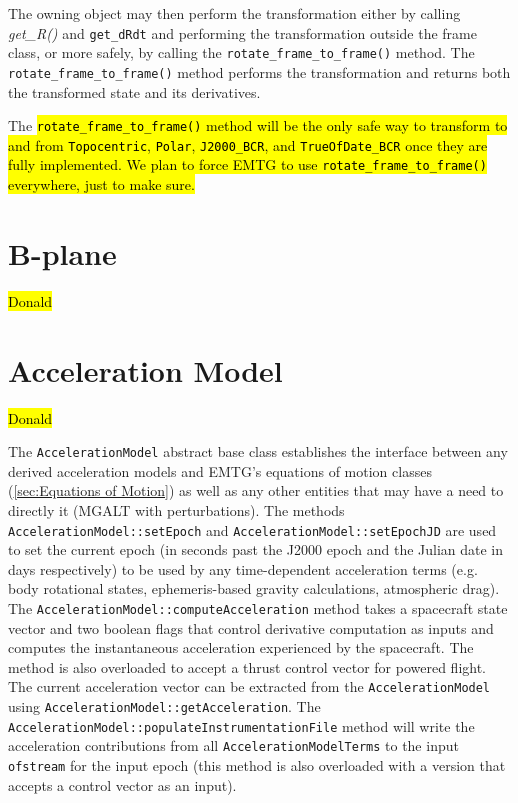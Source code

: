 The owning object may then perform the transformation either by calling \textit{get\_R()} and \texttt{get\_dRdt} and performing the transformation outside the frame class, or more safely, by calling the \texttt{rotate\_frame\_to\_frame()} method. The \texttt{rotate\_frame\_to\_frame()} method performs the transformation and returns both the transformed state and its derivatives.

The \hl{\texttt{rotate\_frame\_to\_frame()} method will be the only safe way to transform to and from \texttt{Topocentric}, \texttt{Polar}, \texttt{J2000\_BCR}, and \texttt{TrueOfDate\_BCR} once they are fully implemented. We plan to force EMTG to use \texttt{rotate\_frame\_to\_frame()} everywhere, just to make sure.}

\section{B-plane}
\label{sec:bplane}

\hl{Donald}

\section{Acceleration Model}
\label{sec:acceleration_model}

\hl{Donald}

The \texttt{AccelerationModel} abstract base class establishes the interface between any derived acceleration models and EMTG's equations of motion classes (\ref{sec:Equations of Motion}) as well as any other entities that may have a need to directly it (MGALT with perturbations). The methods \texttt{AccelerationModel::setEpoch} and \texttt{AccelerationModel::setEpochJD} are used to set the current epoch (in seconds past the J2000 epoch and the Julian date in days respectively) to be used by any time-dependent acceleration terms (e.g. body rotational states, ephemeris-based gravity calculations, atmospheric drag). The \texttt{AccelerationModel::computeAcceleration} method takes a spacecraft state vector and two boolean flags that control derivative computation as inputs and computes the instantaneous acceleration experienced by the spacecraft. The method is also overloaded to accept a thrust control vector for powered flight. The current acceleration vector can be extracted from the \texttt{AccelerationModel} using \texttt{AccelerationModel::getAcceleration}. The \texttt{AccelerationModel::populateInstrumentationFile} method will write the acceleration contributions from all \texttt{AccelerationModelTerms} to the input \texttt{ofstream} for the input epoch (this method is also overloaded with a version that accepts a control vector as an input). 


